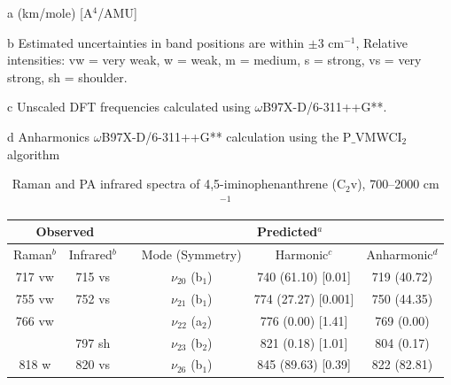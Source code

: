 \begin{table}[H]
\begin{center}
\begin{threeparttable}
	\begin{tablenotes}
		\item[a] (km/mole) [A$^{4}$/AMU]
		\item[b] Estimated uncertainties in band positions are within $\pm$3 cm$^{-1}$, Relative intensities: vw = very weak, w = weak, m = medium, s = strong, vs = very strong, sh = shoulder.
		\item[c] Unscaled DFT frequencies calculated using $\omega$B97X-D/6-311++G**.
		\item[d] Anharmonics $\omega$B97X-D/6-311++G** calculation using the P$\_$VMWCI$_{2}$ algorithm
	\end{tablenotes}
\end{threeparttable}
\end{center}
\label{lowfreq-45-imino}
\end{table}
	
	
	
	
	
	\begin{table}[H]
		\caption{Raman and PA infrared spectra of 4,5-iminophenanthrene (C$_{2}$v), 700–2000 cm$^{-1}$}
		\begin{center}
				\begin{tabular}{c c c c c c}
					\hline
					\multicolumn{ 2}{c}{Observed} & \multicolumn{1}{c}{} & \multicolumn{ 3}{c}{Predicted$^{a}$} \\ \hline
					Raman$^{b}$ & \multicolumn{1}{c}{Infrared$^{b}$} &  & \multicolumn{1}{c}{Mode (Symmetry)} & \multicolumn{1}{c}{Harmonic$^{c}$} & Anharmonic$^{d}$ \\ \hline
	717 vw & 715 vs & & $\nu_{20}$ (b$_{1}$) & 740 (61.10) [0.01] & 719 (40.72) \\ 
	755 vw & 752 vs & &$\nu_{21}$  (b$_{1}$)& 774 (27.27) [0.001] & 750 (44.35) \\ 
	766 vw &  & &$\nu_{22}$ (a$_{2}$) & 776 (0.00) [1.41] & 769 (0.00) \\ 
	& 797 sh & &$\nu_{23}$ (b$_{2}$)& 821 (0.18) [1.01] & 804 (0.17) \\ 
	818 w & 820 vs & & $\nu_{26}$ (b$_{1}$) & 845 (89.63) [0.39] & 822 (82.81) \\ 
	\bottomrule
\end{tabular}
\end{center}
\end{table}



